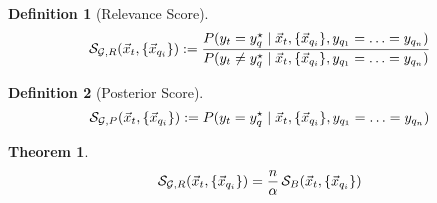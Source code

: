 \documentclass{article}
\theoremstyle{break}
\newtheorem{theorem}{Theorem}[section]
\newtheorem{definition}{Definition}[section]
\begin{document}
 
    \begin{definition}[Relevance Score]
      \begin{equation}
        \mathcal{S}_{\mathcal{G}, R}(\vec x_t, \{{\vec x_{q_i}}\}) := \frac 
            {P(y_t = y_q^{\star} \mid \vec x_t, \{{\vec x_{q_i}}\}, y_{q_1}=\ldots=y_{q_n})}
            {P(y_t \neq y_q^{\star} \mid \vec x_t, \{{\vec x_{q_i}}\}, y_{q_1}=\ldots=y_{q_n})}
      \end{equation}
    \end{definition}

    \begin{definition}[Posterior Score]    
      \begin{equation}
        \mathcal{S}_{\mathcal{G}, P} (\vec x_t, \{{\vec x_{q_i}}\}) :=
            P(y_t = y_q^{\star} \mid \vec x_t, \{{\vec x_{q_i}}\}, y_{q_1}=\ldots=y_{q_n})
      \end{equation}
    \end{definition}

    \begin{theorem}

      \begin{equation}
        \mathcal{S}_{\mathcal{G}, R}(\vec x_t, \{{\vec x_{q_i}}\}) = 
            \frac{n}{\alpha} \, \mathcal{S}_B(\vec x_t, \{{\vec x_{q_i}}\})
      \end{equation}
    \end{theorem}
\end{document}
